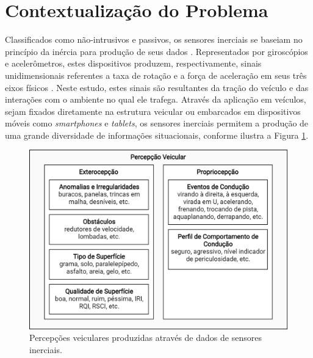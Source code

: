 \section{Contextualização do Problema}

Classificados como não-intrusivos e passivos, os sensores inerciais se baseiam no princípio da inércia para produção de seus dados \cite{Braga2017}. Representados por giroscópios e acelerômetros, estes dispositivos produzem, respectivamente, sinais unidimensionais referentes a taxa de rotação e a força de aceleração em seus três eixos físicos \cite{Groves2013}. Neste estudo, estes sinais são resultantes da tração do veículo e das interações com o ambiente no qual ele trafega. Através da aplicação em veículos, sejam fixados diretamente na estrutura veicular ou embarcados em dispositivos móveis como \textit{smartphones} e \textit{tablets}, os sensores inerciais permitem a produção de uma grande diversidade de informações situacionais, conforme ilustra a Figura \ref{fig:percepcoes_veiculares}.

\begin{figure}[h]
  \centering
  \caption{Percepções veiculares produzidas através de dados de sensores inerciais.}
  \label{fig:percepcoes_veiculares}
  \includegraphics[width=0.9\linewidth]{figuras/fig_2.png}
\end{figure}

